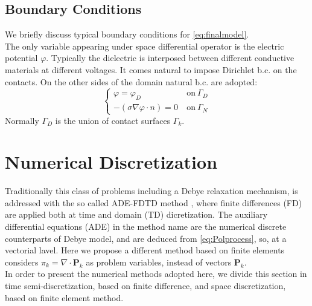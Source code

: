 \documentclass[11pt,a4paper]{article}
\begin{document}
\subsection{Boundary Conditions}
We briefly discuss typical boundary conditions for \eqref{eq:finalmodel}.\\
The only variable appearing under space differential operator is the electric potential \(\varphi\). Typically the dielectric is interposed between different conductive materials at different voltages. It comes natural to impose Dirichlet b.c. on the contacts. On the other sides of the domain natural b.c. are adopted:
\begin{equation}\label{eq:LEVEL1Bc}
	\left\{\begin{aligned}
		\left.\varphi\right. = \varphi_D\ &\ \mathrm{on}\ \Gamma_D\\[3mm]
		-\left.\left(\sigma \nabla  \varphi \cdot n\right) = 0\right. &\ \mathrm{on}\ \Gamma_N
	\end{aligned}\right.
\end{equation}
Normally \(\Gamma_D\) is the union of contact surfaces \(\Gamma_k\).

\section{Numerical Discretization}
Traditionally this class of problems including a Debye relaxation mechanism, is addressed with the so called ADE-FDTD method \cite{taflove}, where finite differences (FD) are applied both at time and domain (TD) dicretization. The auxiliary differential equations (ADE) in the method name are the numerical discrete counterparts of Debye model, and are deduced from \eqref{eq:Polprocess}, so, at a vectorial lavel. Here we propose a different method based on finite elements considers \(\pi_k = \nabla \cdot \mathbf{P}_k\) as problem variables, instead of vectors \(\mathbf{P}_k\).\\
In order to present the numerical methods adopted here, we divide this section in time semi-discretization, based on finite difference, and space discretization, based on finite element method. 
\end{document}
